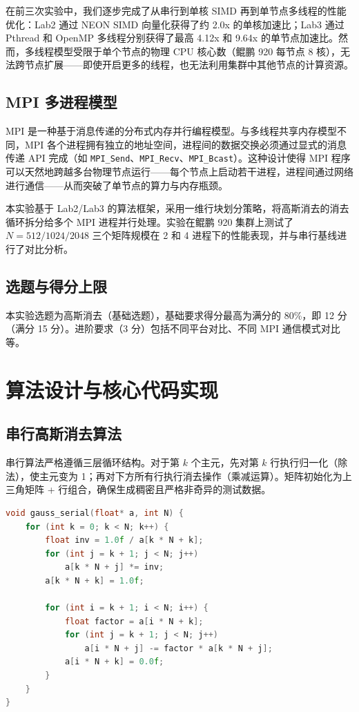 \documentclass[a4paper]{article}
\begin{document}
在前三次实验中，我们逐步完成了从串行到单核 SIMD 再到单节点多线程的性能优化：Lab2 通过 NEON SIMD 向量化获得了约 2.0x 的单核加速比；Lab3 通过 Pthread 和 OpenMP 多线程分别获得了最高 4.12x 和 9.64x 的单节点加速比。然而，多线程模型受限于单个节点的物理 CPU 核心数（鲲鹏 920 每节点 8 核），无法跨节点扩展——即使开启更多的线程，也无法利用集群中其他节点的计算资源。

\subsection{MPI 多进程模型}

MPI 是一种基于消息传递的分布式内存并行编程模型。与多线程共享内存模型不同，MPI 各个进程拥有独立的地址空间，进程间的数据交换必须通过显式的消息传递 API 完成（如 \texttt{MPI\_Send}、\texttt{MPI\_Recv}、\texttt{MPI\_Bcast}）。这种设计使得 MPI 程序可以天然地跨越多台物理节点运行——每个节点上启动若干进程，进程间通过网络进行通信——从而突破了单节点的算力与内存瓶颈。

本实验基于 Lab2/Lab3 的算法框架，采用一维行块划分策略，将高斯消去的消去循环拆分给多个 MPI 进程并行处理。实验在鲲鹏 920 集群上测试了 $N=512/1024/2048$ 三个矩阵规模在 2 和 4 进程下的性能表现，并与串行基线进行了对比分析。

\subsection{选题与得分上限}

本实验选题为高斯消去（基础选题），基础要求得分最高为满分的 80\%，即 12 分（满分 15 分）。进阶要求（3 分）包括不同平台对比、不同 MPI 通信模式对比等。

\section{算法设计与核心代码实现}

\subsection{串行高斯消去算法}

串行算法严格遵循三层循环结构。对于第 $k$ 个主元，先对第 $k$ 行执行归一化（除法），使主元变为 1；再对下方所有行执行消去操作（乘减运算）。矩阵初始化为上三角矩阵 + 行组合，确保生成稠密且严格非奇异的测试数据。

\begin{lstlisting}[title=普通高斯消去串行算法,frame=trbl,language={C++}]
void gauss_serial(float* a, int N) {
    for (int k = 0; k < N; k++) {
        float inv = 1.0f / a[k * N + k];
        for (int j = k + 1; j < N; j++)
            a[k * N + j] *= inv;
        a[k * N + k] = 1.0f;

        for (int i = k + 1; i < N; i++) {
            float factor = a[i * N + k];
            for (int j = k + 1; j < N; j++)
                a[i * N + j] -= factor * a[k * N + j];
            a[i * N + k] = 0.0f;
        }
    }
}
\end{lstlisting}
\end{document}
